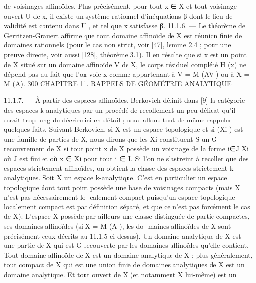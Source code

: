 \documentclass[
  10pt,
]{article}
\newenvironment{Shaded}{}{}
\newcommand{\NormalTok}[1]{#1}
\begin{document}
\begin{Shaded}
\begin{Highlighting}[]
\NormalTok{de voisinages affinoïdes. Plus précisément, pour tout x ∈ X et tout voisinage ouvert U}
\NormalTok{de x, il existe un système rationnel d’inéquations β dont le lieu de validité est contenu}
\NormalTok{dans U , et tel que x satisfasse β̊.}
\NormalTok{11.1.6. — Le théorème de Gerritzen{-}Grauert affirme que tout domaine affinoïde de X}
\NormalTok{est réunion finie de domaines rationnels (pour le cas non strict, voir [47], lemme 2.4 ;}
\NormalTok{pour une preuve directe, voir aussi [128], théorème 3.1). Il en résulte que si x est un}
\NormalTok{point de X situé sur un domaine affinoïde V de X, le corps résiduel complété H (x) ne}
\NormalTok{dépend pas du fait que l’on voie x comme appartenant à V = M (AV ) ou à X = M (A).}
\NormalTok{300                CHAPITRE 11. RAPPELS DE GÉOMÉTRIE ANALYTIQUE}

\NormalTok{11.1.7. — À partir des espaces affinoïdes, Berkovich définit dans [9] la catégorie des}
\NormalTok{espaces k{-}analytiques par un procédé de recollement un peu délicat qu’il serait trop}
\NormalTok{long de décrire ici en détail ; nous allons tout de même rappeler quelques faits. Suivant}
\NormalTok{Berkovich, si X est un espace topologique et si (Xi ) est une famille de parties de X,}
\NormalTok{nous dirons que les Xi constituent}
\NormalTok{                           S         un G{-}recouvrement de X si tout point x de X possède}
\NormalTok{un voisinage de la forme i∈J Xi où J est fini et où x ∈ Xi pour tout i ∈ J. Si l’on}
\NormalTok{ne s’astreint à recoller que des espaces strictement affinoïdes, on obtient la classe des}
\NormalTok{espaces strictement k{-}analytiques.}
\NormalTok{   Soit X un espace k{-}analytique. C’est en particulier un espace topologique dont tout}
\NormalTok{point possède une base de voisinages compacts (mais X n’est pas nécessairement lo{-}}
\NormalTok{calement compact puisqu’un espace topologique localement compact est par définition}
\NormalTok{séparé, et que ce n’est pas forcément le cas de X). L’espace X possède par ailleurs une}
\NormalTok{classe distinguée de partie compactes, ses domaines affinoïdes (si X = M (A ), les do{-}}
\NormalTok{maines affinoïdes de X sont précisément ceux décrits au 11.1.5 ci{-}dessus). Un domaine}
\NormalTok{analytique de X est une partie de X qui est G{-}recouverte par les domaines affinoïdes}
\NormalTok{qu’elle contient. Tout domaine affinoïde de X est un domaine analytique de X ; plus}
\NormalTok{généralement, tout compact de X qui est une union finie de domaines analytiques de}
\NormalTok{X est un domaine analytique. Et tout ouvert de X (et notamment X lui{-}même) est un}

\end{Highlighting}
\end{Shaded}
\end{document}
